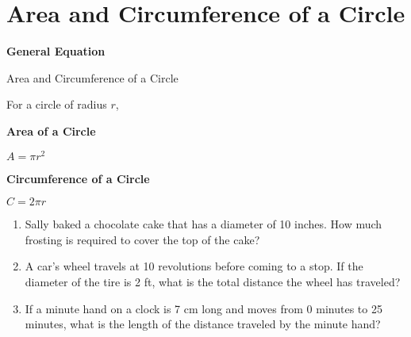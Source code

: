 \section[Circles]{Area and Circumference of a Circle}

\textbf{General Equation}

\bigskip
\begin{equationbox}{Area and Circumference of a Circle}
\setlength{\columnseprule}{0pt}

For a circle of radius $r$,

\begin{center}
\begin{multicols}{2}
\textbf{Area of a Circle}

\medskip
$A=\pi r^2$

\textbf{Circumference of a Circle}

\medskip
$C=2\pi r$
\end{multicols}
\end{center}
\end{equationbox}

\vfill
\begin{enumerate}[labelindent=*,style=multiline,leftmargin=*,label=\textbf{Example \arabic*:}]
\item Sally baked a chocolate cake that has a diameter of 10 inches. How much frosting is required to cover the top of the cake?

\vfill\item A car's wheel travels at 10 revolutions before coming to a stop. If the diameter of the tire is 2 ft, what is the total distance the wheel has traveled?

\vfill\item If a minute hand on a clock is 7 cm long and moves from 0 minutes to 25 minutes, what is the length of the distance traveled by the minute hand?
\end{enumerate}

